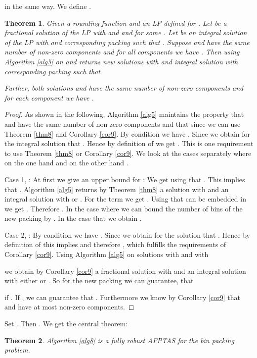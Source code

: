 \documentclass[a4paper,11pt]{article}
\newtheorem{thm}{Theorem}
\begin{document}
in the same way. We define .
\begin{thm}\label{thm15}
	Given a rounding function  and an LP defined for . Let  be a fractional solution of the LP with
	 and  
	and  for some 
	. Let  be	an integral solution of the LP with  and
	corresponding packing  such that .
	Suppose  and  have the same number  of non-zero components and for all components  we have
	.
	Then using 
	Algorithm \ref{alg5} on  and  returns new solutions  with  and integral solution  with corresponding packing  such that
	
	Further, both solutions  and  have the same number  of non-zero components and for each component we have
	.
\end{thm}
\begin{proof}
	As shown in the following, Algorithm \ref{alg5} maintains the property that  and  have
	the same number of non-zero components and that  since we can use Theorem \ref{thm8} and Corollary \ref{cor9}.
	By condition we have . Since
	 we obtain for the integral solution  that
	.
	Hence by definition of  we get . This is one requirement to use Theorem \ref{thm8} 
	or Corollary \ref{cor9}.
	We look at the cases separately where on the one hand  and on the other hand 
	. 
	
	Case 1, :
	At first we give an upper bound for : We get  using
	that . This implies
	that .
	Algorithm \ref{alg5} returns by Theorem \ref{thm8} a solution  with  and an integral solution  with 
	 or .
	For the term  we get  .
	Using that  can be embedded in  we get . 
	Therefore .
	In the case where  we can bound the number of bins of the new packing  
	by	.
	In the case that  we obtain
	.
	
	Case 2, : 
	By condition we have . Since
	 we obtain for the solution  that
	.
	Hence by definition of  this implies  and therefore ,
	which fulfills the requirements of Corollary \ref{cor9}.
	Using Algorithm \ref{alg5} on solutions  with  and  with 
	
	we obtain by Corollary \ref{cor9} a fractional solution  with
	 and an integral solution  with either
	 or .
	So for the new packing  we can guarantee, that
	
	if . If , we can guarantee
	that .
	Furthermore we know by Corollary \ref{cor9} that  and  have at most  
	non-zero components.
\end{proof}
Set . Then .
We get the central theorem:
\begin{thm}\label{thm16}
  Algorithm \ref{alg8} is a fully robust AFPTAS for the bin packing problem.
\end{thm}
\end{document}
